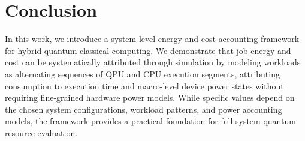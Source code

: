 \section{Conclusion}
\label{sec:conclusion}

In this work, we introduce a system-level energy and cost accounting framework for hybrid quantum-classical computing. We demonstrate that job energy and cost can be systematically attributed through simulation by modeling workloads as alternating sequences of QPU and CPU execution segments, attributing consumption to execution time and macro-level device power states without requiring fine-grained hardware power models. While specific values depend on the chosen system configurations, workload patterns, and power accounting models, the framework provides a practical foundation for full-system quantum resource evaluation.
